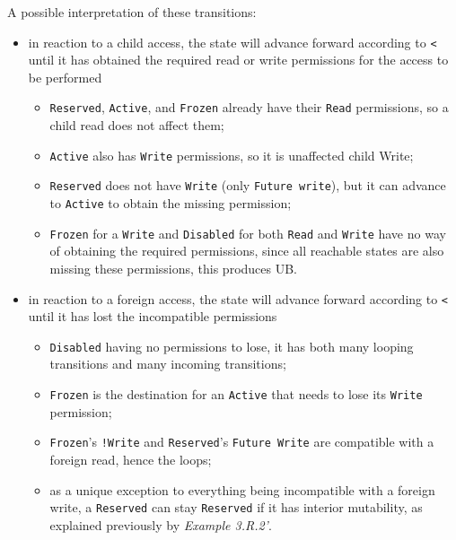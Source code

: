 \documentclass[a4paper,11pt]{article}
\theoremstyle{plain}
\theoremstyle{definition}
\theoremstyle{remark}
\newcommand{\tcode}[1]{\texttt{#1}}
\newcommand{\tperm}[1]{\texttt{#1}}
\begin{document}
A possible interpretation of these transitions:
\begin{itemize}
    \item in reaction to a child access, the state will advance forward according to \tperm{<} until
        it has obtained the required read or write permissions for the access to be performed
        \begin{itemize}
            \item \tperm{Reserved}, \tperm{Active}, and \tperm{Frozen} already have their \tperm{Read} permissions,
                so a child read does not affect them;
            \item \tperm{Active} also has \tperm{Write} permissions, so it is unaffected child Write;
            \item \tperm{Reserved} does not have \tperm{Write} (only \tperm{Future write}), but it can advance to \tperm{Active} to
                obtain the missing permission;
            \item \tperm{Frozen} for a \tperm{Write} and \tperm{Disabled} for both \tperm{Read} and \tperm{Write} have no way of
                obtaining the required permissions, since all reachable states are also missing these
                permissions, this produces UB.
        \end{itemize}
    \item in reaction to a foreign access, the state will advance forward according to \tcode{<} until
        it has lost the incompatible permissions
        \begin{itemize}
            \item \tperm{Disabled} having no permissions to lose, it has both many looping transitions and many incoming transitions;
            \item \tperm{Frozen} is the destination for an \tperm{Active} that needs to lose its \tperm{Write} permission;
            \item \tperm{Frozen}'s \tperm{!Write} and \tperm{Reserved}'s \tperm{Future Write} are compatible with a foreign read, hence the loops;
            \item as a unique exception to everything being incompatible with a foreign write, a \tperm{Reserved} can stay
                \tperm{Reserved} if it has interior mutability, as explained previously by \textit{Example 3.R.2'}.
        \end{itemize}
\end{itemize}
\end{document}
